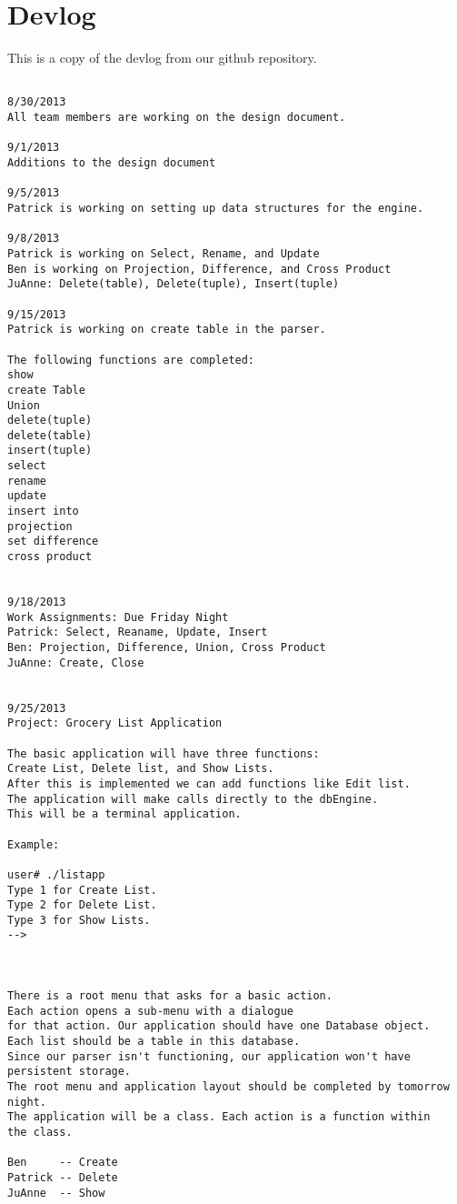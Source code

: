 \documentclass{article}
\begin{document}
\section{Devlog}
This is a copy of the devlog from our github repository.
\begin{verbatim}

8/30/2013
All team members are working on the design document.

9/1/2013
Additions to the design document

9/5/2013
Patrick is working on setting up data structures for the engine.

9/8/2013
Patrick is working on Select, Rename, and Update
Ben is working on Projection, Difference, and Cross Product
JuAnne: Delete(table), Delete(tuple), Insert(tuple)

9/15/2013
Patrick is working on create table in the parser.

The following functions are completed:
show
create Table
Union
delete(tuple)
delete(table)
insert(tuple)
select
rename
update
insert into
projection
set difference
cross product


9/18/2013
Work Assignments: Due Friday Night
Patrick: Select, Reaname, Update, Insert
Ben: Projection, Difference, Union, Cross Product
JuAnne: Create, Close 


9/25/2013
Project: Grocery List Application

The basic application will have three functions: 
Create List, Delete list, and Show Lists.
After this is implemented we can add functions like Edit list. 
The application will make calls directly to the dbEngine. 
This will be a terminal application.

Example:

user# ./listapp
Type 1 for Create List.
Type 2 for Delete List.
Type 3 for Show Lists.
-->



There is a root menu that asks for a basic action.
Each action opens a sub-menu with a dialogue
for that action. Our application should have one Database object. 
Each list should be a table in this database.
Since our parser isn't functioning, our application won't have persistent storage. 
The root menu and application layout should be completed by tomorrow night.
The application will be a class. Each action is a function within
the class. 

Ben     -- Create
Patrick -- Delete
JuAnne  -- Show
\end{verbatim}
\end{document}
